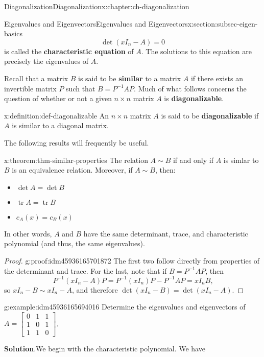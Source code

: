 \documentclass[oneside,10pt,]{book}
\newcommand{\blocktitlefont}{\relax}
\newcommand{\terminology}[1]{\textbf{#1}}
\numberwithin{equation}{section}
\newcommand{\bbm}{\begin{bmatrix}}
\newcommand{\ebm}{\end{bmatrix}}
\newcommand{\tr}{\operatorname{tr}}
\newcommand{\amp}{&}
\begin{document}
\begin{chapterptx}{Diagonalization}{}{Diagonalization}{}{}{x:chapter:ch-diagonalization}
\begin{sectionptx}{Eigenvalues and Eigenvectors}{}{Eigenvalues and Eigenvectors}{}{}{x:section:subsec-eigen-basics}
\begin{equation}
\det(xI_n - A) = 0\label{x:men:eq-characteristic}
\end{equation}
is called the \terminology{characteristic equation} of \(A\). The solutions to this equation are precisely the eigenvalues of \(A\).%
\par
Recall that a matrix \(B\) is said to be \terminology{similar} to a matrix \(A\) if there exists an invertible matrix \(P\) such that \(B = P^{-1}AP\). Much of what follows concerns the question of whether or not a given \(n\times n\) matrix \(A\) is \terminology{diagonalizable}.%
\begin{definition}{}{x:definition:def-diagonalizable}%
An \(n\times n\) matrix \(A\) is said to be \terminology{diagonalizable} if \(A\) is similar to a diagonal matrix.%
\end{definition}
The following results will frequently be useful.%
\begin{theorem}{}{}{x:theorem:thm-similar-properties}%
The relation \(A\sim B\) if and only if \(A\) is simlar to \(B\) is an equivalence relation. Moreover, if \(A\sim B\), then:%
\begin{itemize}[label=\textbullet]
\item{}\(\displaystyle \det A = \det B\)%
\item{}\(\displaystyle \tr A = \tr B\)%
\item{}\(\displaystyle c_A(x) = c_B(x)\)%
\end{itemize}
In other words, \(A\) and \(B\) have the same determinant, trace, and characteristic polynomial (and thus, the same eigenvalues).%
\end{theorem}
\begin{proof}{}{g:proof:idm45936165701872}
The first two follow directly from properties of the determinant and trace. For the last, note that if \(B = P^{-1}AP\), then%
\begin{equation*}
P^{-1}(xI_n-A)P = P^{-1}(xI_n)P-P^{-1}AP = xI_n B\text{,}
\end{equation*}
so \(xI_n-B\sim xI_n-A\), and therefore \(\det(xI_n-B)=\det(xI_n-A)\).%
\end{proof}
\begin{example}{}{g:example:idm45936165694016}%
Determine the eigenvalues and eigenvectors of \(A = \bbm 0\amp 1\amp 1\\1\amp 0\amp 1\\1\amp 1\amp 0\ebm\).%
\par\smallskip%
\noindent\textbf{\blocktitlefont Solution}.\label{g:solution:idm45936165693024}{}\hypertarget{g:solution:idm45936165693024}{}\quad{}We begin with the characteristic polynomial. We have%

\end{example}
\end{sectionptx}
\end{chapterptx}
\end{document}
